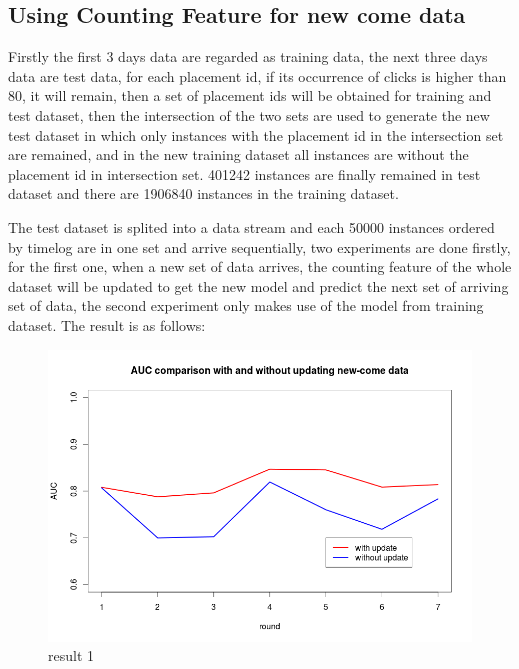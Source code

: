 \documentclass{article}
\begin{document}
\subsection{Using Counting Feature for new come data}

Firstly the first 3 days data are regarded as training data, the next three days data are test data, for each placement id, if its occurrence of clicks is higher than 80, it will remain, then a set of placement ids will be obtained for training and test dataset, then the intersection of the two sets are used to generate the new test dataset in which only instances with the placement id in the intersection set are remained, and in the new training dataset all instances are without the placement id in intersection set. 401242
instances are finally remained in test dataset and there are 1906840 instances in the training dataset. \vspace{3mm}

The test dataset is splited into a data stream and each 50000 instances ordered by timelog are in one set and arrive sequentially, two experiments are done firstly, for the first one, when a new set of data arrives, the counting feature of the whole dataset will be updated to get the new model and predict the next set of arriving set of data, the second experiment only makes use of the model from training dataset. The result is as follows:
\begin{figure}[h]
\caption{result 1}
\centering
\includegraphics[width=13cm]{countupdate.png}
\end{figure}
 
\end{document}
